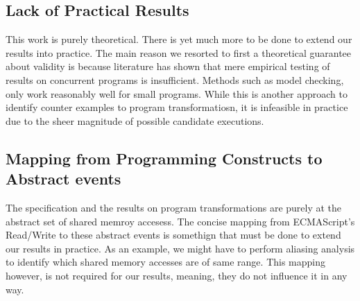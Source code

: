     \subsection{Lack of Practical Results}

    This work is purely theoretical. There is yet much more to be done to extend our results into practice. 
    The main reason we resorted to first a theoretical guarantee about validity is because literature has shown that mere empirical testing of results on concurrent programs is insufficient. 
    Methods such as model checking, only work reasonably well for small programs. While this is another approach to identify counter examples to program transformatiosn, it is infeasible in practice due to the sheer magnitude of possible candidate executions.

    \subsection{Mapping from Programming Constructs to Abstract events}

    The specification and the results on program transformations are purely at the abstract set of shared memroy accesess.
    The concise mapping from ECMAScript's Read/Write to these abstract events is somethign that must be done to extend our results in practice.
    As an example, we might have to perform aliasing analysis to identify which shared memory accesses are of same range. 
    This mapping however, is not required for our results, meaning, they do not influence it in any way.
  
 

   